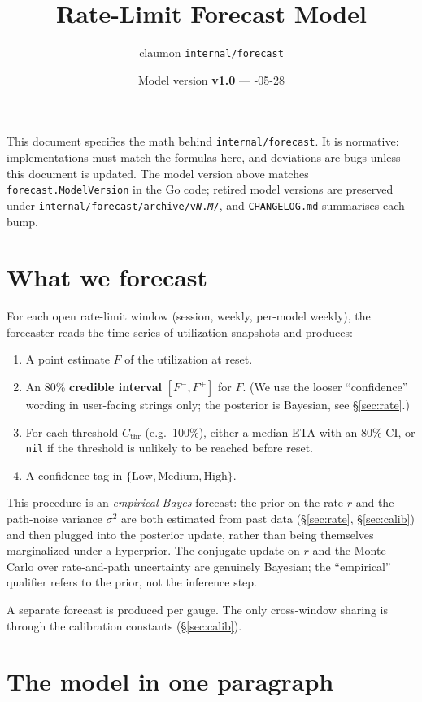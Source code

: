 \documentclass[11pt]{article}
\title{Rate-Limit Forecast Model}
\author{claumon \texttt{internal/forecast}}
\date{Model version \textbf{v1.0} \enspace --- \enspace 2026-05-28}
\newcommand{\Cthr}{C_{\text{thr}}}
\begin{document}
\maketitle

This document specifies the math behind \texttt{internal/forecast}. It is
normative: implementations must match the formulas here, and deviations are
bugs unless this document is updated. The model version above matches
\texttt{forecast.ModelVersion} in the Go code; retired model versions are
preserved under \texttt{internal/forecast/archive/v\textit{N}.\textit{M}/},
and \texttt{CHANGELOG.md} summarises each bump.

\section{What we forecast}

For each open rate-limit window (session, weekly, per-model weekly), the
forecaster reads the time series of utilization snapshots and produces:

\begin{enumerate}
  \item A point estimate $F$ of the utilization at reset.
  \item An 80\% \textbf{credible interval} $[F^-, F^+]$ for $F$. (We use the
    looser ``confidence'' wording in user-facing strings only; the posterior
    is Bayesian, see \S\ref{sec:rate}.)
  \item For each threshold $\Cthr$ (e.g.\ 100\%), either a median ETA with an
    80\% CI, or \texttt{nil} if the threshold is unlikely to be reached
    before reset.
  \item A confidence tag in $\{\text{Low}, \text{Medium}, \text{High}\}$.
\end{enumerate}

This procedure is an \emph{empirical Bayes} forecast: the prior on the rate
$r$ and the path-noise variance $\sigma^2$ are both estimated from past data
(\S\ref{sec:rate}, \S\ref{sec:calib}) and then plugged into the posterior
update, rather than being themselves marginalized under a hyperprior. The
conjugate update on $r$ and the Monte Carlo over rate-and-path uncertainty
are genuinely Bayesian; the ``empirical'' qualifier refers to the prior, not
the inference step.

A separate forecast is produced per gauge. The only cross-window sharing is
through the calibration constants (\S\ref{sec:calib}).

\section{The model in one paragraph}
\end{document}
